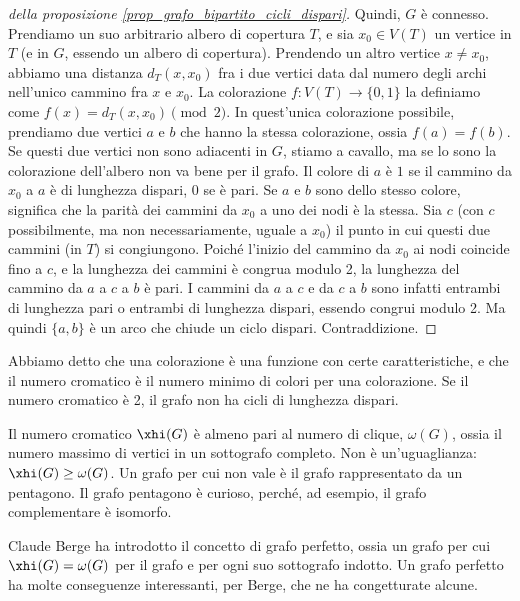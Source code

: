 \begin{proof}[della proposizione \ref{prop_grafo_bipartito_cicli_dispari}]
		Quindi, $G$ \`e connesso.
		Prendiamo un suo arbitrario albero di copertura $T$, e sia $x_0 \in V(T)$ un vertice in $T$ (e in $G$, essendo un albero di copertura).
		Prendendo un altro vertice $x \neq x_0$, abbiamo una distanza $d_T(x,x_0)$ fra i due vertici data dal numero degli archi nell'unico cammino fra $x$ e $x_0$.
		La colorazione $f : V(T) \to \{ 0, 1 \}$ la definiamo come $f(x) = d_T(x, x_0) \pmod{2}$.
		In quest'unica colorazione possibile, prendiamo due vertici $a$ e $b$ che hanno la stessa colorazione, ossia $f(a) = f(b)$.
		Se questi due vertici non sono adiacenti in $G$, stiamo a cavallo, ma se lo sono la colorazione dell'albero non va bene per il grafo.
		Il colore di $a$ \`e $1$ se il cammino da $x_0$ a $a$ \`e di lunghezza dispari, $0$ se \`e pari.
		Se $a$ e $b$ sono dello stesso colore, significa che la parit\`a dei cammini da $x_0$ a uno dei nodi \`e la stessa.
		Sia $c$ (con $c$ possibilmente, ma non necessariamente, uguale a $x_0$) il punto in cui questi due cammini (in $T$) si congiungono.
		Poich\'e l'inizio del cammino da $x_0$ ai nodi coincide fino a $c$, e la lunghezza dei cammini \`e congrua modulo 2, la lunghezza del cammino da $a$ a $c$ a $b$ \`e pari.
		I cammini da $a$ a $c$ e da $c$ a $b$ sono infatti entrambi di lunghezza pari o entrambi di lunghezza dispari, essendo congrui modulo 2.
		Ma quindi $\{a,b\}$ \`e un arco che chiude un ciclo dispari.
		Contraddizione.

	\end{proof}

	Abbiamo detto che una colorazione \`e una funzione con certe caratteristiche, e che il numero cromatico \`e il numero minimo di colori per una colorazione.
	Se il numero cromatico \`e 2, il grafo non ha cicli di lunghezza dispari.

	Il numero cromatico $\xhi(G)$ \`e almeno pari al numero di clique, $\omega(G)$, ossia il numero massimo di vertici in un sottografo completo.
	Non \`e un'uguaglianza: $\xhi(G) \ge \omega(G)$.
	Un grafo per cui non vale \`e il grafo rappresentato da un pentagono.
	Il grafo pentagono \`e curioso, perch\'e, ad esempio, il grafo complementare \`e isomorfo.


	Claude Berge ha introdotto il concetto di grafo perfetto, ossia un grafo per cui $\xhi(G) = \omega(G)$ per il grafo e per ogni suo sottografo indotto.
	Un grafo perfetto ha molte conseguenze interessanti, per Berge, che ne ha congetturate alcune.

